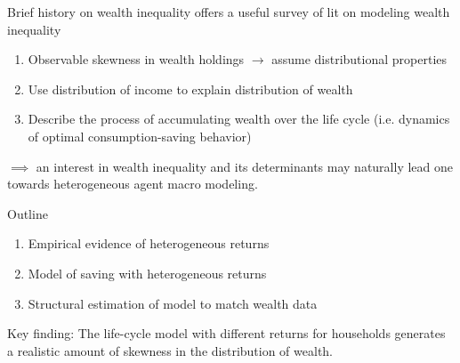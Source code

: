 \documentclass{beamer}
\begin{document}




    


\begin{frame}{Brief history on wealth inequality}
\cite{jbab18} offers a useful survey of lit on modeling wealth inequality
\begin{enumerate}
\item Observable skewness in wealth holdings $\rightarrow$ assume distributional properties
\item Use distribution of income to explain distribution of wealth
\item Describe the process of accumulating wealth over the life cycle (i.e. dynamics of optimal consumption-saving behavior)
\end{enumerate}

\vspace{2.5mm}
$\implies$ an interest in wealth inequality and its determinants may naturally lead one towards heterogeneous agent macro modeling.

\end{frame}


\begin{frame}{Outline}
\begin{enumerate}
\item Empirical evidence of heterogeneous returns
\item Model of saving with heterogeneous returns
\item Structural estimation of model to match wealth data
\end{enumerate}

\vspace{2.5mm}
Key finding: The life-cycle model with different returns for households generates a realistic amount of skewness in the distribution of wealth.


\end{frame}
\end{document}
